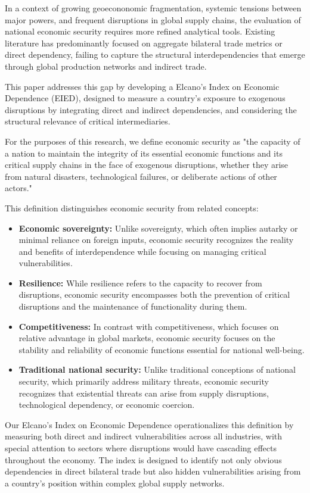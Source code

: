 \documentclass[final,1p,times,authoryear]{elsarticle}
\begin{document}
In a context of growing geoecononomic fragmentation, systemic tensions between major powers, and frequent disruptions in global supply chains, the evaluation of national economic security requires more refined analytical tools. Existing literature has predominantly focused on aggregate bilateral trade metrics or direct dependency, failing to capture the structural interdependencies that emerge through global production networks and indirect trade.

This paper addresses this gap by developing a Elcano's Index on Economic Dependence (EIED), designed to measure a country's exposure to exogenous disruptions by integrating direct and indirect dependencies, and considering the structural relevance of critical intermediaries.

For the purposes of this research, we define economic security as "the capacity of a nation to maintain the integrity of its essential economic functions and its critical supply chains in the face of exogenous disruptions, whether they arise from natural disasters, technological failures, or deliberate actions of other actors."

This definition distinguishes economic security from related concepts:
\begin{itemize}
    \item \textbf{Economic sovereignty:} Unlike sovereignty, which often implies autarky or minimal reliance on foreign inputs, economic security recognizes the reality and benefits of interdependence while focusing on managing critical vulnerabilities.
    \item \textbf{Resilience:} While resilience refers to the capacity to recover from disruptions, economic security encompasses both the prevention of critical disruptions and the maintenance of functionality during them.
    \item \textbf{Competitiveness:} In contrast with competitiveness, which focuses on relative advantage in global markets, economic security focuses on the stability and reliability of economic functions essential for national well-being.
    \item \textbf{Traditional national security:} Unlike traditional conceptions of national security, which primarily address military threats, economic security recognizes that existential threats can arise from supply disruptions, technological dependency, or economic coercion.
\end{itemize}

Our Elcano's Index on Economic Dependence operationalizes this definition by measuring both direct and indirect vulnerabilities across all industries, with special attention to sectors where disruptions would have cascading effects throughout the economy. The index is designed to identify not only obvious dependencies in direct bilateral trade but also hidden vulnerabilities arising from a country's position within complex global supply networks.
\end{document}
